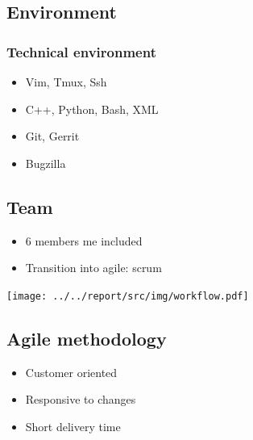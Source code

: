 \subsection{Environment}
\begin{frame}
    \frametitle{Technical environment}
    \begin{itemize}
        \item Vim, Tmux, Ssh
        \item C++, Python, Bash, XML
        \item Git, Gerrit
        \item Bugzilla
    \end{itemize}
\end{frame}

\subsection{Team}
\begin{FrameWithSubSection}
    \begin{minipage}{0.49\textwidth}
        \begin{itemize}
            \item 6 members me included
            \item Transition into agile: scrum
        \end{itemize}
    \end{minipage}
    \begin{minipage}{0.49\textwidth}
        \flushright
        \texttt{[image: ../../report/src/img/workflow.pdf]}
    \end{minipage}
\end{FrameWithSubSection}

\subsection{Agile methodology}
\begin{FrameWithSubSection}
    \begin{itemize}
        \item Customer oriented
        \item Responsive to changes
        \item Short delivery time
    \end{itemize}
\end{FrameWithSubSection}

